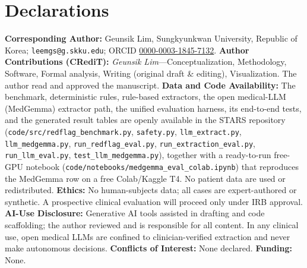 \documentclass[11pt]{article}
\begin{document}
\section*{Declarations}
\textbf{Corresponding Author:} Geunsik Lim, Sungkyunkwan University, Republic of Korea; \texttt{leemgs@g.skku.edu}; ORCID \href{https://orcid.org/0000-0003-1845-7132}{0000-0003-1845-7132}. \textbf{Author Contributions (CRediT):} \emph{Geunsik Lim}---Conceptualization, Methodology, Software, Formal analysis, Writing (original draft \& editing), Visualization. The author read and approved the manuscript. \textbf{Data and Code Availability:} The benchmark, deterministic rules, rule-based extractors, the open medical-LLM (MedGemma) extractor path, the unified evaluation harness, its end-to-end tests, and the generated result tables are openly available in the STARS repository (\texttt{code/src/redflag\_benchmark.py}, \texttt{safety.py}, \texttt{llm\_extract.py}, \texttt{llm\_medgemma.py}, \texttt{run\_redflag\_eval.py}, \texttt{run\_extraction\_eval.py}, \texttt{run\_llm\_eval.py}, \texttt{test\_llm\_medgemma.py}), together with a ready-to-run free-GPU notebook (\texttt{code/notebooks/medgemma\_eval\_colab.ipynb}) that reproduces the MedGemma row on a free Colab/Kaggle T4. No patient data are used or redistributed. \textbf{Ethics:} No human-subjects data; all cases are expert-authored or synthetic. A prospective clinical evaluation will proceed only under IRB approval. \textbf{AI-Use Disclosure:} Generative AI tools assisted in drafting and code scaffolding; the author reviewed and is responsible for all content. In any clinical use, open medical LLMs are confined to clinician-verified extraction and never make autonomous decisions. \textbf{Conflicts of Interest:} None declared. \textbf{Funding:} None.
\end{document}
